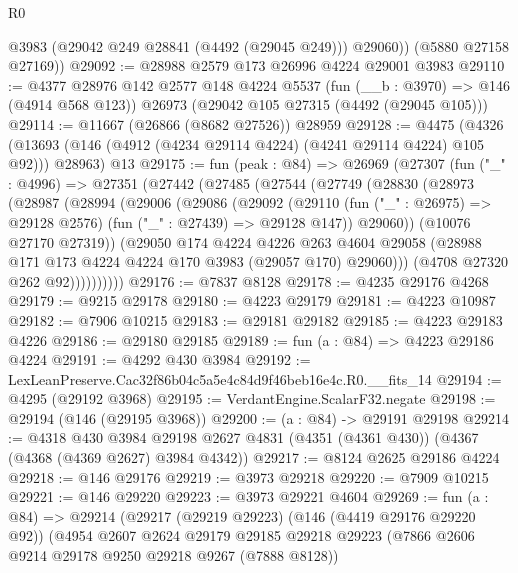 \begin{lexlean}{R0}
\begin{coremodule}
          @3983
          (@29042 @249 @28841 (@4492 (@29045 @249)))
          @29060))
      (@5880 @27158 @27169))
@29092 := @28988 @2579 @173 @26996 @4224 @29001 @3983
@29110 := @4377
    @28976
    @142
    @2577
    @148
    @4224
    @5537
    (fun (__b : @3970) => @146 (@4914 @568 @123))
    @26973
    (@29042 @105 @27315 (@4492 (@29045 @105)))
@29114 := @11667 (@26866 (@8682 @27526)) @28959
@29128 := @4475
    (@4326 (@13693 (@146 (@4912 (@4234 @29114 @4224) (@4241 @29114 @4224) @105 @92))) @28963)
    @13
@29175 := fun (peak : @84) =>
  @26969
    (@27307
      (fun ("_" : @4996) =>
      @27351
        (@27442
          (@27485
            (@27544
              (@27749
                (@28830
                  (@28973
                    (@28987
                      (@28994
                        (@29006
                          (@29086
                            (@29092
                              (@29110
                                (fun ("_" : @26975) => @29128 @2576)
                                (fun ("_" : @27439) => @29128 @147))
                              @29060))
                          (@10076 @27170 @27319))
                        (@29050
                          @174
                          @4224
                          @4226
                          @263
                          @4604
                          @29058
                          (@28988 @171 @173 @4224 @4224 @170 @3983 (@29057 @170) @29060)))
                      (@4708 @27320 @262 @92))))))))))
@29176 := @7837 @8128
@29178 := @4235 @29176 @4268
@29179 := @9215 @29178
@29180 := @4223 @29179
@29181 := @4223 @10987
@29182 := @7906 @10215
@29183 := @29181 @29182
@29185 := @4223 @29183 @4226
@29186 := @29180 @29185
@29189 := fun (a : @84) => @4223 @29186 @4224
@29191 := @4292 @430 @3984
@29192 := LexLeanPreserve.Cac32f86b04c5a5e4c84d9f46beb16e4c.R0.__fits_14
@29194 := @4295 (@29192 @3968)
@29195 := VerdantEngine.ScalarF32.negate
@29198 := @29194 (@146 (@29195 @3968))
@29200 := (a : @84) -> @29191 @29198
@29214 := @4318
    @430
    @3984
    @29198
    @2627
    @4831
    (@4351 (@4361 @430))
    (@4367 (@4368 (@4369 @2627) @3984 @4342))
@29217 := @8124 @2625 @29186 @4224
@29218 := @146 @29176
@29219 := @3973 @29218
@29220 := @7909 @10215
@29221 := @146 @29220
@29223 := @3973 @29221 @4604
@29269 := fun (a : @84) =>
  @29214
    (@29217
      (@29219 @29223)
      (@146 (@4419 @29176 @29220 @92))
      (@4954
        @2607
        @2624
        @29179
        @29185
        @29218
        @29223
        (@7866 @2606 @9214 @29178 @9250 @29218 @9267 (@7888 @8128))

\end{coremodule}
\end{lexlean}
